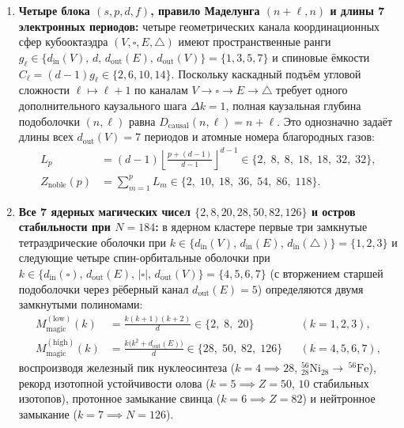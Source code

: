 \begin{theorem}
\begin{enumerate}[leftmargin=*]
\item \textbf{Четыре блока $(s,p,d,f)$, правило Маделунга $(n+\ell,n)$ и длины 7 электронных периодов:}
  четыре геометрических канала координационных сфер кубооктаэдра $(V,\square,E,\triangle)$ имеют пространственные ранги $g_\ell \in \{d_{\mathrm{in}}(V),\, d,\, d_{\mathrm{out}}(E),\, d_{\mathrm{out}}(V)\} = \{1,3,5,7\}$ и спиновые ёмкости $C_\ell = (d-1)g_\ell \in \{2,6,10,14\}$.
  Поскольку каскадный подъём угловой сложности $\ell \mapsto \ell + 1$ по каналам $V\to\square\to E\to\triangle$ требует одного дополнительного каузального шага $\Delta k = 1$, полная каузальная глубина подоболочки $(n,\ell)$ равна $D_{\mathrm{causal}}(n,\ell) = n + \ell$. Это однозначно задаёт длины всех $d_{\mathrm{out}}(V) = 7$ периодов и атомные номера благородных газов:
  \begin{equation}
  \label{eq:chem-madelung-periods}
  \begin{aligned}
    L_p &= (d-1)\!\left\lfloor\frac{p + (d-1)}{d-1}\right\rfloor^{\!d-1} \in \bigl\{2,\; 8,\; 8,\; 18,\; 18,\; 32,\; 32\bigr\},\\
    Z_{\mathrm{noble}}(p) &= \sum_{m=1}^p L_m \in \bigl\{2,\; 10,\; 18,\; 36,\; 54,\; 86,\; 118\bigr\}.
  \end{aligned}
  \end{equation}
\item \textbf{Все 7 ядерных магических чисел $\{2,8,20,28,50,82,126\}$ и остров стабильности при $N=184$:}
  в ядерном кластере первые три замкнутые тетраэдрические оболочки при $k \in \{d_{\mathrm{in}}(V),\, d_{\mathrm{in}}(E),\, d_{\mathrm{in}}(\triangle)\} = \{1,2,3\}$ и следующие четыре спин-орбитальные оболочки при $k \in \{d_{\mathrm{in}}(\square),\, d_{\mathrm{out}}(E),\, |\square|,\, d_{\mathrm{out}}(V)\} = \{4,5,6,7\}$ (с вторжением старшей подоболочки через рёберный канал $d_{\mathrm{out}}(E)=5$) определяются двумя замкнутыми полиномами:
  \begin{equation}
  \label{eq:chem-nuclear-magic-polynomials}
  \begin{aligned}
    M_{\mathrm{magic}}^{(\mathrm{low})}(k) &= \frac{k(k+1)(k+2)}{d} \in \bigl\{2,\; 8,\; 20\bigr\} &&(k = 1,2,3),\\
    M_{\mathrm{magic}}^{(\mathrm{high})}(k) &= \frac{k\bigl(k^2 + d_{\mathrm{out}}(E)\bigr)}{d} \in \bigl\{28,\; 50,\; 82,\; 126\bigr\} &&(k = 4,5,6,7),
  \end{aligned}
  \end{equation}
  воспроизводя железный пик нуклеосинтеза ($k=4 \implies 28$, $^{56}_{28}\text{Ni}_{28}\to\,^{56}\text{Fe}$), рекорд изотопной устойчивости олова ($k=5 \implies Z=50$, $10$ стабильных изотопов), протонное замыкание свинца ($k=6 \implies Z=82$) и нейтронное замыкание ($k=7 \implies N=126$).

\end{enumerate}
\end{theorem}
